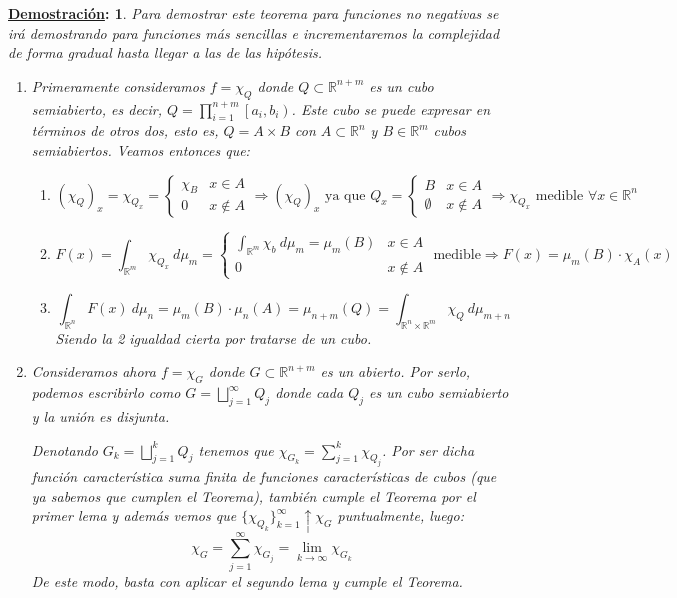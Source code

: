 \documentclass[10pt,a4paper,openright]{book}
\theoremstyle{break}
\newtheorem*{demo}{\underline{Demostración}:}
\newcommand{\dif}[1]{\ d#1}
\begin{document}
\begin{demo}
Para demostrar este teorema para funciones no negativas se irá demostrando para funciones más sencillas e incrementaremos la complejidad de forma gradual hasta llegar a las de las hipótesis.

\begin{enumerate}
\item Primeramente consideramos $f = \chi_{Q}$ donde $Q \subset \mathbb{R}^{n+m}$ es un cubo semiabierto, es decir, $Q = \prod_{i=1}^{n+m} \left[a_i, b_i\right)$. Este cubo se puede expresar en términos de otros dos, esto es, $Q = A \times B$ con $A \subset \mathbb{R}^n$ y $B \in \mathbb{R}^m$ cubos semiabiertos. Veamos entonces que:
\begin{enumerate}
    \item
    $$\left(\chi_Q\right)_x = \chi_{Q_x} = \begin{cases} \chi_B &  x \in A\\ 0 &  x \not\in A \end{cases} \Rightarrow \left(\chi_Q\right)_x \text{ ya que }Q_x = \begin{cases} B & x\in A \\ \emptyset & x\notin A \end{cases}\Rightarrow \chi_{Q_x} \text{ medible }\forall x \in \mathbb{R}^n$$
    \item
    $$F \left(x\right) = \int_{\mathbb{R}^m} \chi_{Q_x} \dif{\mu_m} = \begin{cases} \int_{\mathbb{R}^m} \chi_b \dif{\mu_m} = \mu_m \left(B\right) & x \in A \\ 0 & x \not\in A\end{cases} \text{ medible} \Rightarrow F \left(x\right) = \mu_m \left(B\right)\cdot \chi_A \left(x\right)$$
    \item
    $$\int_{\mathbb{R}^n} F \left(x\right) \dif{\mu_n} = \mu_m \left(B\right) \cdot \mu_n \left(A\right) = \mu_{n+m} \left(Q\right) = \int_{\mathbb{R}^n \times \mathbb{R}^m} \chi_Q \dif{\mu_{m+n}} $$
    Siendo la 2 igualdad cierta por tratarse de un cubo.
\end{enumerate}
\item Consideramos ahora $f = \chi_G$ donde $G \subset \mathbb{R}^{n+m}$ es un abierto. Por serlo, podemos escribirlo como $G = \bigsqcup_{j=1}^{\infty} Q_j$ donde cada $Q_j$ es un cubo semiabierto y la unión es disjunta.

Denotando $G_k = \bigsqcup_{j=1}^{k} Q_j$ tenemos que $\chi_{G_k} = \sum_{j=1}^{k} \chi_{Q_j}$. Por ser dicha función característica suma finita de funciones características de cubos (que ya sabemos que cumplen el Teorema), también cumple el Teorema por el primer lema y además vemos que $\{\chi_{Q_k}\}_{k=1}^{\infty} \uparrow \chi_G$ puntualmente, luego:
$$\chi_G = \sum_{j=1}^{\infty} \chi_{G_j} = \lim_{k \rightarrow \infty}\chi_{G_k} $$
De este modo, basta con aplicar el segundo lema y cumple el Teorema.


\end{enumerate}
\end{demo}
\end{document}
